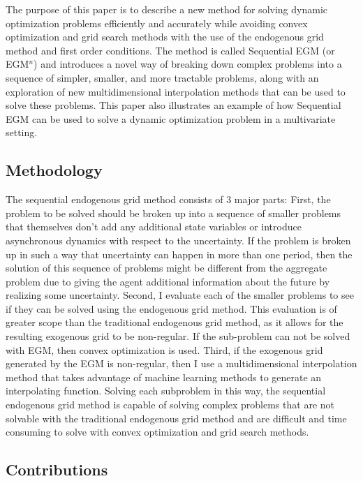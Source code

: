 \documentclass[\econtexRoot/SequentialEGM]{subfiles}
\begin{document}
The purpose of this paper is to describe a new method for solving dynamic optimization problems efficiently and accurately while avoiding convex optimization and grid search methods with the use of the endogenous grid method and first order conditions. The method is called Sequential EGM (or EGM$^n$) and introduces a novel way of breaking down complex problems into a sequence of simpler, smaller, and more tractable problems, along with an exploration of new multidimensional interpolation methods that can be used to solve these problems. This paper also illustrates an example of how Sequential EGM can be used to solve a dynamic optimization problem in a multivariate setting.

\subsection{Methodology} %

The sequential endogenous grid method consists of 3 major parts: First, the problem to be solved should be broken up into a sequence of smaller problems that themselves don't add any additional state variables or introduce asynchronous dynamics with respect to the uncertainty. If the problem is broken up in such a way that uncertainty can happen in more than one period, then the solution of this sequence of problems might be different from the aggregate problem due to giving the agent additional information about the future by realizing some uncertainty. Second, I evaluate each of the smaller problems to see if they can be solved using the endogenous grid method. This evaluation is of greater scope than the traditional endogenous grid method, as it allows for the resulting exogenous grid to be non-regular. If the sub-problem can not be solved with EGM, then convex optimization is used. Third, if the exogenous grid generated by the EGM is non-regular, then I use a multidimensional interpolation method that takes advantage of machine learning methods to generate an interpolating function. Solving each subproblem in this way, the sequential endogenous grid method is capable of solving complex problems that are not solvable with the traditional endogenous grid method and are difficult and time consuming to solve with convex optimization and grid search methods.

\subsection{Contributions} %
\end{document}
